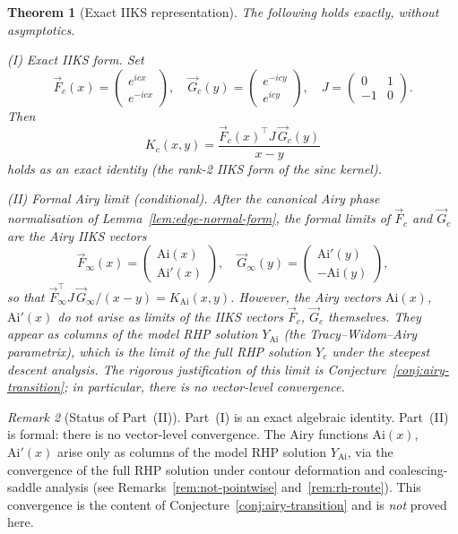 \documentclass[12pt,a4paper]{amsart}
\newtheorem{theorem}{Theorem}[section]
\theoremstyle{definition}
\theoremstyle{remark}
\newtheorem{remark}[theorem]{Remark}
\newcommand{\Ai}{\mathrm{Ai}}
\begin{document}
\begin{theorem}[Exact IIKS representation]
\label{thm:emergent-iiks}
The following holds exactly, without asymptotics.

\medskip
\textup{(I) Exact IIKS form.}
Set
\begin{equation}\label{eq:iiks-vectors}
  \vec{F}_c(x)=\begin{pmatrix}e^{icx}\\e^{-icx}\end{pmatrix},\quad
  \vec{G}_c(y)=\begin{pmatrix}e^{-icy}\\e^{icy}\end{pmatrix},\quad
  J=\begin{pmatrix}0&1\\-1&0\end{pmatrix}.
\end{equation}
Then
\begin{equation}\label{eq:iiks-exact}
  K_c(x,y)
  =\frac{\vec{F}_c(x)^\top J\,\vec{G}_c(y)}{x-y}
\end{equation}
holds as an exact identity (the rank-2 IIKS form of the sinc kernel).

\medskip
\textup{(II) Formal Airy limit (conditional).}
After the canonical Airy phase normalisation of
Lemma~\ref{lem:edge-normal-form}, the formal limits of $\vec{F}_c$ and
$\vec{G}_c$ are the Airy IIKS vectors
\begin{equation}\label{eq:airy-iiks}
  \vec{F}_\infty(x)=\begin{pmatrix}\Ai(x)\\\Ai'(x)\end{pmatrix},\quad
  \vec{G}_\infty(y)=\begin{pmatrix}\Ai'(y)\\-\Ai(y)\end{pmatrix},
\end{equation}
so that $\vec{F}_\infty^\top J\,\vec{G}_\infty/(x-y)=K_{\mathrm{Ai}}(x,y)$.
\emph{However, the Airy vectors $\Ai(x)$, $\Ai'(x)$ do not arise as
limits of the IIKS vectors $\vec{F}_c$, $\vec{G}_c$ themselves.
They appear as columns of the model RHP solution $Y_{\mathrm{Ai}}$
(the Tracy--Widom--Airy parametrix), which is the limit of the full
RHP solution $Y_c$ under the steepest descent analysis.}
The rigorous justification of this limit is
Conjecture~\ref{conj:airy-transition}; in particular, there is
no vector-level convergence.
\end{theorem}

\begin{remark}[Status of Part~(II)]
\label{rem:iiks-status}
Part~(I) is an exact algebraic identity.
Part~(II) is formal: there is no vector-level convergence.
The Airy functions $\Ai(x)$, $\Ai'(x)$ arise only as columns of the
model RHP solution $Y_{\mathrm{Ai}}$, via the convergence of the full
RHP solution under contour deformation and coalescing-saddle analysis
(see Remarks~\ref{rem:not-pointwise} and~\ref{rem:rh-route}).
This convergence is the content of Conjecture~\ref{conj:airy-transition}
and is \emph{not} proved here.
\end{remark}
\end{document}

